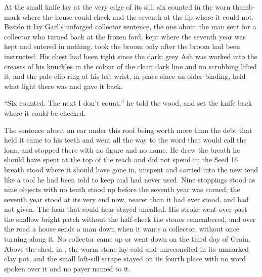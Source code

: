 \scenebreak

At  the small knife lay at the very edge of its sill, six counted in the worn thumb-mark where the house could check and the seventh at the lip where it could not. Beside it lay Garl's unforged collector sentence, the one about the man sent for a collector who turned back at the frozen ford, kept where the seventh year was kept and entered in nothing.  took the broom only after the broom had been instructed. His chest had been tight since the dark; grey Ash was worked into the creases of his knuckles in the colour of the clean dark line and no scrubbing lifted it, and the pale clip-ring at his left wrist, in place since an older binding, held what light there was and gave it back.

“Six counted. The next I don't count,” he told the wood, and set the knife back where it could be checked.

The sentence about an ear under this roof being worth more than the debt that held it came to his teeth and went all the way to the word that would call the loan, and stopped there with no figure and no name. He drew the breath he should have spent at the top of the reach and did not spend it; the Seed 16 breath stood where it should have gone in, unspent and carried into the new tend like a tool he had been told to keep and had never used. Nine stoppings stood as nine objects with no tenth stood up before the seventh year was earned; the seventh year stood at its very end now, nearer than it had ever stood, and had not given. The loan that could hear stayed uncalled. His stroke went over  past the shallow bright patch without the half-check the stones remembered, and over the road a house sends a man down when it wants a collector, without once turning along it. No collector came up or went down  on the third day of Grain. Above the shed, in , the warm stone lay cold and unreconciled in its unmarked clay pot, and the small loft-sill scrape stayed on its fourth place with no word spoken over it and no payer named to it.

\scenebreak

